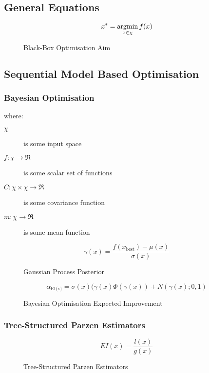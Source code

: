 \subsection{General Equations}

\begin{figure}[h]
\begin{equation}
    x^* = \operatornamewithlimits{argmin}\limits_{x \in \chi} f(x)
\end{equation}
\caption{Black-Box Optimisation Aim}
\end{figure}

\subsection{Sequential Model Based Optimisation}

\subsubsection{Bayesian Optimisation}
where:
\begin{description}
\item[$\chi$] is some input space
\item[$f:\chi \rightarrow \Re$] is some scalar set of functions
\item[$C:\chi \times \chi \rightarrow \Re$] is some covariance function
\item[$m:\chi \rightarrow \Re$] is some mean function 
\end{description}

\begin{figure}[h]
\begin{equation}
    \gamma(x) = \frac{f(x_\textrm{best}) - \mu(x)}{\sigma(x)}
\end{equation}
\caption{Gaussian Process Posterior}
\end{figure}

\begin{figure}[h]
\begin{equation}
    \alpha_\textrm{EI(x)}=\sigma(x)(\gamma(x)\Phi(\gamma(x)) + N(\gamma(x); 0,1)
\end{equation}
\caption{Bayesian Optimisation Expected Improvement}
\end{figure}

\subsubsection{Tree-Structured Parzen Estimators}
\begin{figure}[h]
\begin{equation}
    EI(x) = \frac{l(x)}{g(x)}
\end{equation}
\caption{Tree-Structured Parzen Estimators}
\end{figure}


